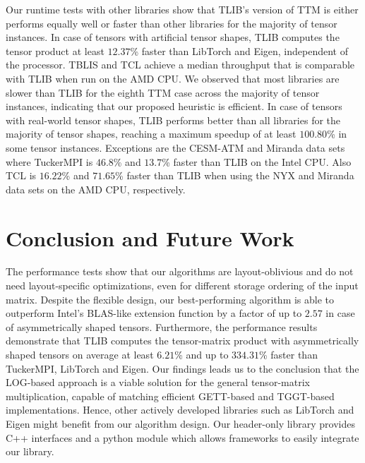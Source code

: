 Our runtime tests with other libraries show that TLIB's  version of TTM is either performs equally well or faster than other libraries for the majority of tensor instances.
In case of tensors with artificial tensor shapes, TLIB computes the tensor product at least $12.37$\% faster than LibTorch and Eigen, independent of the processor.
TBLIS and TCL achieve a median throughput that is comparable with TLIB when run on the AMD CPU.
We observed that most libraries are slower than TLIB for the eighth TTM case across the majority of tensor instances, indicating that our proposed heuristic is efficient.
In case of tensors with real-world tensor shapes, TLIB performs better than all libraries for the majority of tensor shapes, reaching a maximum speedup of at least $100.80$\% in some tensor instances.
Exceptions are the CESM-ATM and Miranda data sets where TuckerMPI is $46.8$\% and $13.7$\% faster than TLIB on the Intel CPU.
Also TCL is $16.22$\% and $71.65$\% faster than TLIB when using the NYX and Miranda data sets on the AMD CPU, respectively.


\section{Conclusion and Future Work}
\label{sec:conclusion}
The performance tests show that our algorithms are layout-oblivious and do not need layout-specific optimizations, even for different storage ordering of the input matrix.
Despite the flexible design, our best-performing algorithm is able to outperform Intel's BLAS-like extension function  by a factor of up to $2.57$ in case of asymmetrically shaped tensors.
Furthermore, the performance results demonstrate that TLIB computes the tensor-matrix product with asymmetrically shaped tensors on average at least $6.21$\% and up to $334.31$\% faster than TuckerMPI, LibTorch and Eigen.
Our findings leads us to the conclusion that the LOG-based approach is a viable solution for the general tensor-matrix multiplication, capable of matching efficient GETT-based and TGGT-based implementations.
Hence, other actively developed libraries such as LibTorch and Eigen might benefit from our algorithm design.
Our header-only library provides C++ interfaces and a python module which allows frameworks to easily integrate our library.

